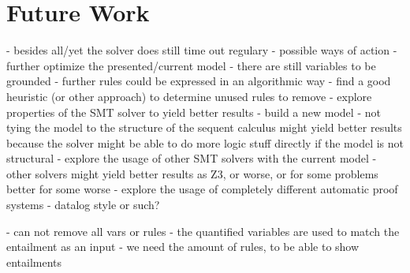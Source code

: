 \section{Future Work}
  - besides all/yet the solver does still time out regulary
  - possible ways of action
    - further optimize the presented/current model
      - there are still variables to be grounded
      - further rules could be expressed in an algorithmic way
      - find a good heuristic (or other approach) to determine unused rules to remove
      - explore properties of the SMT solver to yield better results
    - build a new model
      - not tying the model to the structure of the sequent calculus might yield better results
        because the solver might be able to do more logic stuff directly if the model is not structural
    - explore the usage of other SMT solvers with the current model
      - other solvers might yield better results as Z3,
        or worse, or for some problems better for some worse
    - explore the usage of completely different automatic proof systems
      - datalog style or such?


  


- can not remove all vars or rules
- the quantified variables are used to match the entailment as an input
- we need the amount of rules, to be able to show entailments


